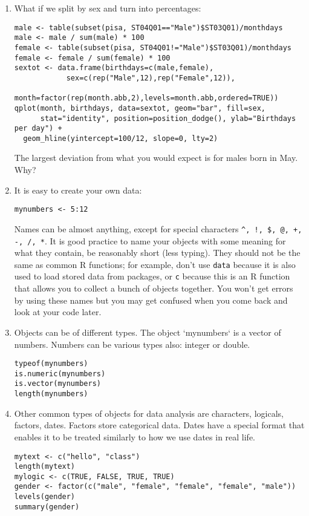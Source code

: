 \documentclass[11pt]{article}
\begin{document}
\begin{enumerate}
\item What if we split by sex and turn into percentages:
\begin{verbatim}
male <- table(subset(pisa, ST04Q01=="Male")$ST03Q01)/monthdays
male <- male / sum(male) * 100
female <- table(subset(pisa, ST04Q01!="Male")$ST03Q01)/monthdays
female <- female / sum(female) * 100
sextot <- data.frame(birthdays=c(male,female),
            sex=c(rep("Male",12),rep("Female",12)),
            month=factor(rep(month.abb,2),levels=month.abb,ordered=TRUE))
qplot(month, birthdays, data=sextot, geom="bar", fill=sex, 
      stat="identity", position=position_dodge(), ylab="Birthdays per day") +
  geom_hline(yintercept=100/12, slope=0, lty=2)
\end{verbatim}
The largest deviation from what you would expect is for males born in May. Why?

\item It is easy to create your own data:

\begin{verbatim}
mynumbers <- 5:12
\end{verbatim}

Names can be almost anything, except for special characters \verb|^, !, $, @, +, -, /, *|. It is good practice to name your objects with some meaning for what they contain, be reasonably short (less typing). They should not be the same as common R functions; for example, don't use \verb|data| because it is also used to load stored data from packages, or \verb|c| because this is an R function that allows you to collect a bunch of objects together. You won't get errors by using these names but you may get confused when you come back and look at your code later. 


\item Objects can be of different types. The object `mynumbers` is a vector of numbers. Numbers can be various types also: integer or double.
\begin{verbatim}
typeof(mynumbers)
is.numeric(mynumbers)
is.vector(mynumbers)
length(mynumbers)
\end{verbatim}

\item 
Other common types of objects for data analysis are characters, logicals, factors, dates. Factors store categorical data. Dates have a special format that enables it to be treated similarly to how we use dates in real life.
\begin{verbatim}
mytext <- c("hello", "class")
length(mytext)
mylogic <- c(TRUE, FALSE, TRUE, TRUE)
gender <- factor(c("male", "female", "female", "female", "male"))
levels(gender)
summary(gender)
\end{verbatim}


\end{enumerate}
\end{document}
